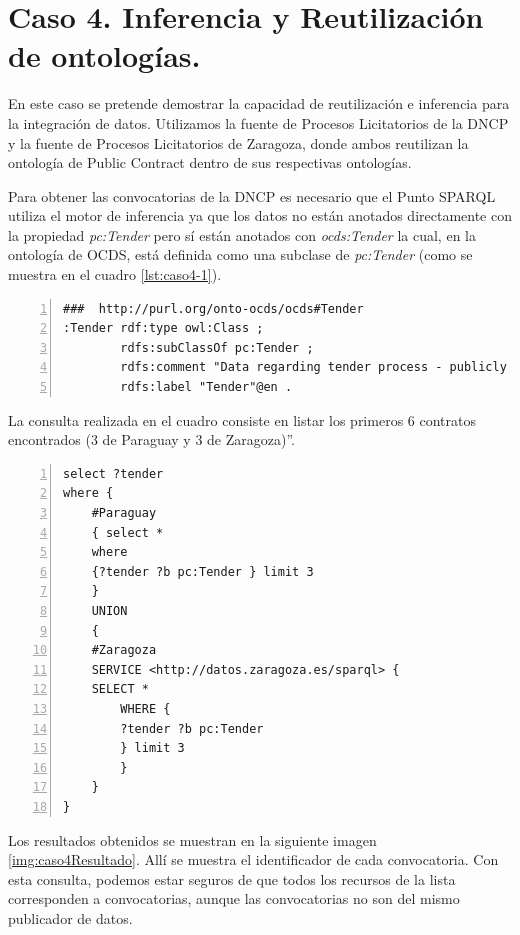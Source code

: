 \section{Caso 4. Inferencia y Reutilización de ontologías. }

En este caso se pretende demostrar la capacidad de reutilización e inferencia para la integración de datos. Utilizamos la fuente de Procesos Licitatorios de la DNCP y la fuente de Procesos Licitatorios de Zaragoza, donde ambos reutilizan la ontología de Public Contract dentro de sus respectivas ontologías.

Para obtener las convocatorias de la DNCP es necesario que el Punto SPARQL utiliza el motor de inferencia ya que los datos no están anotados directamente con la propiedad \textit{pc:Tender} pero sí están anotados con \textit{ocds:Tender} la cual, en la ontología de OCDS, está definida como una subclase de \textit{pc:Tender} (como se muestra en el cuadro \ref{lst:caso4-1}).

\begin{lstlisting}[captionpos=b, caption=Extension de la ontologia reutilizando PC, label={lst:caso4-1},  numbers=left,  numberstyle=\tiny\color{mygray},
    basicstyle=\ttfamily,frame=single]
###  http://purl.org/onto-ocds/ocds#Tender
:Tender rdf:type owl:Class ;
        rdfs:subClassOf pc:Tender ;
        rdfs:comment "Data regarding tender process - publicly inviting prospective contractors to submit bids for evaluation and selecting a winner or winners"@en ;
        rdfs:label "Tender"@en .
 \end{lstlisting}

 

 La consulta realizada en el cuadro  consiste en listar los primeros 6 contratos encontrados (3 de Paraguay y 3 de Zaragoza)”.

 \begin{lstlisting}[captionpos=b, caption=Consulta a dos fuentes de datos utilizando el mismo concepto, label={lst:caso4-2},  numbers=left,  numberstyle=\tiny\color{mygray},
    basicstyle=\ttfamily,frame=single]
select ?tender
where {
    #Paraguay
    { select * 
    where 
    {?tender ?b pc:Tender } limit 3 
    }
    UNION 
    { 
    #Zaragoza
    SERVICE <http://datos.zaragoza.es/sparql> {
    SELECT * 
        WHERE {
        ?tender ?b pc:Tender 
        } limit 3
        }
    }
}
 \end{lstlisting}

 Los resultados obtenidos se muestran en la siguiente imagen \ref{img:caso4Resultado}. Allí se muestra el identificador de cada convocatoria. Con esta consulta, podemos estar seguros de que todos los recursos de la lista corresponden a convocatorias, aunque las convocatorias no son del mismo publicador de datos.



